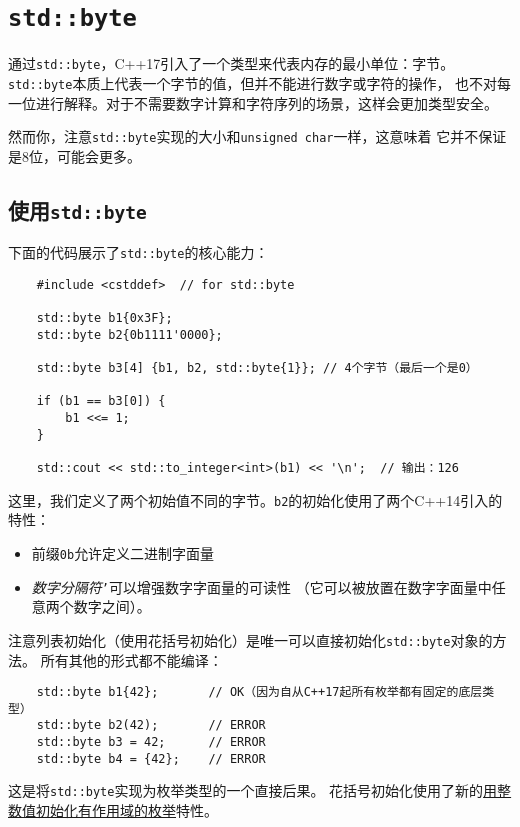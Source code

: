 \chapter{\texttt{std::byte}}\label{ch18}
通过\texttt{std::byte}，C++17引入了一个类型来代表内存的最小单位：字节。
\texttt{std::byte}本质上代表一个字节的值，但并不能进行数字或字符的操作，
也不对每一位进行解释。对于不需要数字计算和字符序列的场景，这样会更加类型安全。

然而你，注意\texttt{std::byte}实现的大小和\texttt{unsigned char}一样，这意味着
它并不保证是8位，可能会更多。


\section{使用\texttt{std::byte}}
下面的代码展示了\texttt{std::byte}的核心能力：
\begin{lstlisting}
    #include <cstddef>  // for std::byte

    std::byte b1{0x3F};
    std::byte b2{0b1111'0000};

    std::byte b3[4] {b1, b2, std::byte{1}}; // 4个字节（最后一个是0）

    if (b1 == b3[0]) {
        b1 <<= 1;
    }

    std::cout << std::to_integer<int>(b1) << '\n';  // 输出：126
\end{lstlisting}
这里，我们定义了两个初始值不同的字节。\texttt{b2}的初始化使用了两个C++14引入的特性：
\begin{itemize}
    \item 前缀\texttt{0b}允许定义二进制字面量
    \item \emph{数字分隔符}\texttt{'}可以增强数字字面量的可读性
    （它可以被放置在数字字面量中任意两个数字之间）。
\end{itemize}
注意列表初始化（使用花括号初始化）是唯一可以直接初始化\texttt{std::byte}对象的方法。
所有其他的形式都不能编译：
\begin{lstlisting}
    std::byte b1{42};       // OK（因为自从C++17起所有枚举都有固定的底层类型）
    std::byte b2(42);       // ERROR
    std::byte b3 = 42;      // ERROR
    std::byte b4 = {42};    // ERROR
\end{lstlisting}
这是将\texttt{std::byte}实现为枚举类型的一个直接后果。
花括号初始化使用了新的\hyperref[ch8.3]{用整数值初始化有作用域的枚举}特性。

